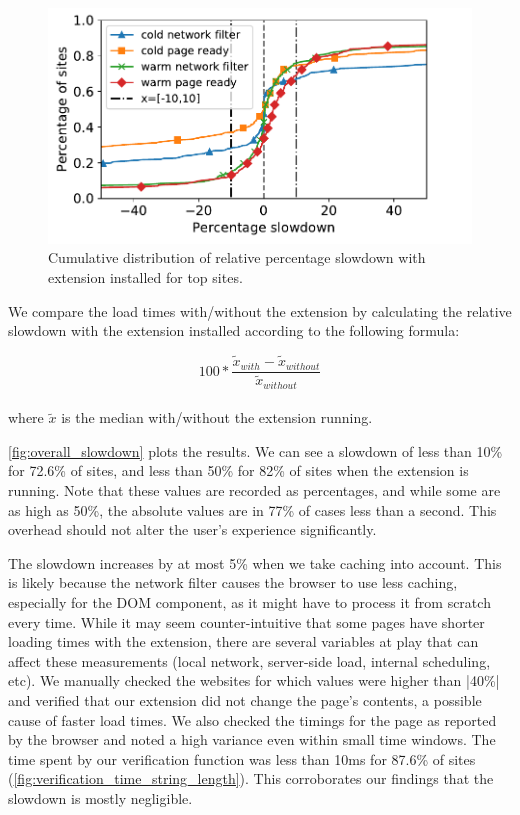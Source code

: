 \begin{figure}[h]
		\begin{center}
	\includegraphics[scale=0.5]{results/extension_slowdown_overall_small.pdf}
	\caption{Cumulative distribution of relative percentage slowdown with extension installed for top sites.}
	\label{fig:overall_slowdown}
\end{center}
	
\end{figure}

We compare the load times with/without the extension by calculating the relative slowdown with the extension installed according to the following formula:

\begin{equation*}
100*\frac{\tilde{x}_{with}-\tilde{x}_{without}}{\tilde{x}_{without}}
\end{equation*}
\\
where $\tilde{x}$ is the median with/without the extension running.

\autoref{fig:overall_slowdown} plots the results. We can see
a slowdown of less than 10\% for 72.6\% of sites, and less than
50\% for 82\% of sites when the extension is running. Note that these
values are recorded as percentages, and while some are as high as
50\%, the absolute values are in 77\% of cases less than a
second. This overhead should not alter the user's experience
significantly.

The slowdown increases by at most 5\% when we take caching into
account. This is likely because the network filter causes the browser
to use less caching, especially for the DOM component, as it might
have to process it from scratch every time. While it may seem
counter-intuitive that some pages have shorter loading times with
the extension, there are several variables at play that can affect
these measurements (local network, server-side load, internal
scheduling, etc). We manually checked the websites for which values
were higher than |40\%| and verified that our extension did not change
the page's contents, a possible cause of faster load times. We also
checked the timings for the page as reported by the browser and noted
a high variance even within small time windows. The time spent by our
verification function was less than 10ms for 87.6\% of sites
(\autoref{fig:verification_time_string_length}). This corroborates our
findings that the slowdown is mostly negligible.

